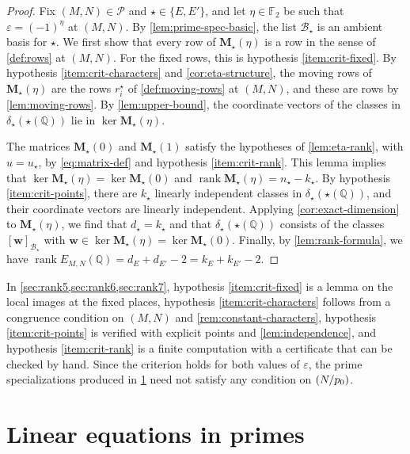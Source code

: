 \documentclass[12pt,oneside,openany]{book}
\theoremstyle{definition}
\theoremstyle{plain}
\numberwithin{equation}{chapter}
\theoremstyle{plain}
\theoremstyle{definition}
\theoremstyle{remark}
\newcommand{\Q}{\mathbb Q}
\newcommand{\F}{\mathbb F}
\DeclareMathOperator{\rk}{rank}
\newcommand{\leg}[2]{\mathchoice{\left(\frac{#1}{#2}\right)}{(#1/#2)}{(#1/#2)}{(#1/#2)}}
\newcommand{\sq}[1]{[#1]}
\newcommand{\cB}{\mathcal B}
\newcommand{\cP}{\mathcal P}
\newcommand{\eps}{\varepsilon}
\begin{document}
\begin{proof}
Fix $(M,N)\in\cP$ and $\star\in\{E,E'\}$, and let $\eta\in\F_2$ be such that $\eps=(-1)^\eta$ at $(M,N)$. By \cref{lem:prime-spec-basic}, the list $\cB_\star$ is an ambient basis for $\star$. We first show that every row of $\mathbf M_\star(\eta)$ is a row in the sense of \cref{def:rows} at $(M,N)$. For the fixed rows, this is hypothesis \ref{item:crit-fixed}. By hypothesis \ref{item:crit-characters} and \cref{cor:eta-structure}, the moving rows of $\mathbf M_\star(\eta)$ are the rows $r^\star_i$ of \cref{def:moving-rows} at $(M,N)$, and these are rows by \cref{lem:moving-rows}. By \cref{lem:upper-bound}, the coordinate vectors of the classes in $\delta_\star(\star(\Q))$ lie in $\ker\mathbf M_\star(\eta)$.

The matrices $\mathbf M_\star(0)$ and $\mathbf M_\star(1)$ satisfy the hypotheses of \cref{lem:eta-rank}, with $u=u_\star$, by \eqref{eq:matrix-def} and hypothesis \ref{item:crit-rank}. This lemma implies that $\ker\mathbf M_\star(\eta)=\ker\mathbf M_\star(0)$ and $\rk\mathbf M_\star(\eta)=n_\star-k_\star$. By hypothesis \ref{item:crit-points}, there are $k_\star$ linearly independent classes in $\delta_\star(\star(\Q))$, and their coordinate vectors are linearly independent. Applying \cref{cor:exact-dimension} to $\mathbf M_\star(\eta)$, we find that $d_\star=k_\star$ and that $\delta_\star(\star(\Q))$ consists of the classes $\sq{\mathbf w}_{\cB_\star}$ with $\mathbf w\in\ker\mathbf M_\star(\eta)=\ker\mathbf M_\star(0)$. Finally, by \cref{lem:rank-formula}, we have $\rk E_{M,N}(\Q)=d_E+d_{E'}-2=k_E+k_{E'}-2$.
\end{proof}

In \cref{sec:rank5,sec:rank6,sec:rank7}, hypothesis \ref{item:crit-fixed} is a lemma on the local images at the fixed places, hypothesis \ref{item:crit-characters} follows from a congruence condition on $(M,N)$ and \cref{rem:constant-characters}, hypothesis \ref{item:crit-points} is verified with explicit points and \cref{lem:independence}, and hypothesis \ref{item:crit-rank} is a finite computation with a certificate that can be checked by hand. Since the criterion holds for both values of $\eps$, the prime specializations produced in \cref{sec:primes} need not satisfy any condition on $\leg N{p_0}$.
\chapter{Linear equations in primes}\label{sec:primes}
\end{document}
